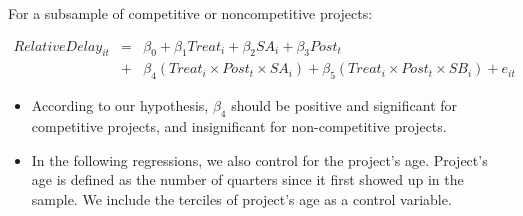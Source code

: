 \documentclass[
]{article}
\begin{document}
For a subsample of competitive or noncompetitive projects:

\[ \begin{aligned} RelativeDelay_{it} &=& \beta_0 +\beta_1 Treat_i+ \beta_2 SA_i+ \beta_3 Post_t \\&+& \beta_4 (Treat_i \times Post_t \times SA_i )+\beta_5 (Treat_i \times Post_t \times SB_i )+e_{it} \end{aligned} \]

\begin{itemize}
\item
  According to our hypothesis, \(\beta_4\) should be positive and
  significant for competitive projects, and insignificant for
  non-competitive projects.
\item
  In the following regressions, we also control for the project's age.
  Project's age is defined as the number of quarters since it first
  showed up in the sample. We include the terciles of project's age as a
  control variable.
\end{itemize}
\end{document}

